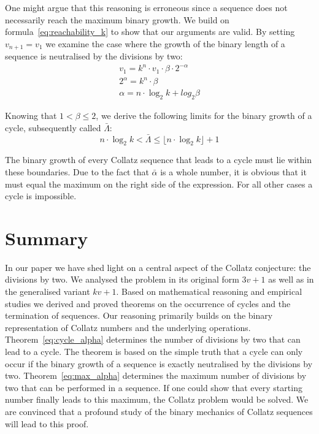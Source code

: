 \documentclass{SciPress_2015}
\renewcommand{\large}{\fontsize{14}{18pt}\selectfont}
\newcommand{\titleformat}{\sffamily\bfseries \large}						%
\begin{document}
\par\medskip
One might argue that this reasoning is erroneous since a sequence does not necessarily reach the maximum binary growth. We build on formula~\ref{eq:reachability_k} to show that our arguments are valid. By setting $v_{n+1}=v_1$ we examine the case where the growth of the binary length of a sequence is neutralised by the divisions by two:
\[
\begin{array}{l}
v_1=k^n\cdot v_1\cdot\beta\cdot2^{-\alpha}\\
2^{\alpha}=k^n\cdot\beta\\
\alpha=n\cdot\log_2k+log_2\beta
\end{array}
\]

Knowing that $1<\beta\le2$, we derive the following limits for the binary growth of a cycle, subsequently called $\bar\Lambda$:
\[
n\cdot\log_2k<\bar\Lambda\le\lfloor n\cdot\log_2k\rfloor+1
\]

The binary growth of every Collatz sequence that leads to a cycle must lie within these boundaries. Due to the fact that $\bar\alpha$ is a whole number, it is obvious that it must equal the maximum on the right side of the expression. For all other cases a cycle is impossible.

\section{Summary}
In our paper we have shed light on a central aspect of the Collatz conjecture: the divisions by two. We analysed the problem in its original form $3v+1$ as well as in the generalised variant $kv+1$. Based on mathematical reasoning and empirical studies we derived and proved theorems on the occurrence of cycles and the termination of sequences. Our reasoning primarily builds on the binary representation of Collatz numbers and the underlying operations. Theorem~\ref{eq:cycle_alpha} determines the number of divisions by two that can lead to a cycle. The theorem is based on the simple truth that a cycle can only occur if the binary growth of a sequence is exactly neutralised by the divisions by two. Theorem~\ref{eq:max_alpha} determines the maximum number of divisions by two that can be performed in a sequence. If one could show that every starting number finally leads to this maximum, the Collatz problem would be solved. We are convinced that a profound study of the binary mechanics of Collatz sequences will lead to this proof.\\[1.5em]

\par\noindent
{\titleformat{Appendix}}
\end{document}
